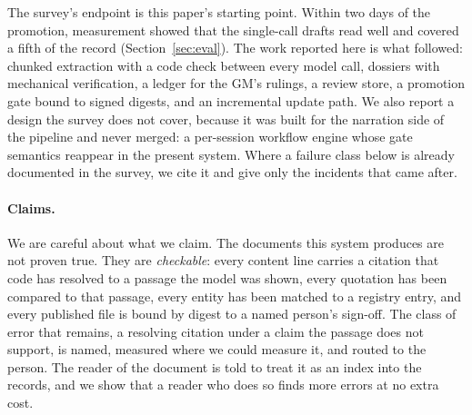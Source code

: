 \documentclass[11pt]{article}
\begin{document}
The survey's endpoint is this paper's starting point. Within two days of the promotion,
measurement showed that the single-call drafts read well and covered a fifth of the
record (Section~\ref{sec:eval}). The work reported here is what followed: chunked
extraction with a code check between every model call, dossiers with mechanical
verification, a ledger for the GM's rulings, a review store, a promotion gate bound to
signed digests, and an incremental update path. We also report a design the survey does
not cover, because it was built for the narration side of the pipeline and never merged:
a per-session workflow engine whose gate semantics reappear in the present system.
Where a failure class below is already documented in the survey, we cite it and give
only the incidents that came after.

\paragraph{Claims.} We are careful about what we claim. The documents this system
produces are not proven true. They are \emph{checkable}: every content line carries a
citation that code has resolved to a passage the model was shown, every quotation has
been compared to that passage, every entity has been matched to a registry entry, and
every published file is bound by digest to a named person's sign-off. The class of error
that remains, a resolving citation under a claim the passage does not support, is named,
measured where we could measure it, and routed to the person. The reader of the document
is told to treat it as an index into the records, and we show that a reader who does so
finds more errors at no extra cost.
\end{document}
